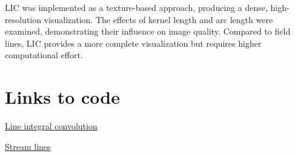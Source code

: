 \documentclass{article}
\begin{document}
LIC was implemented as a texture-based approach, producing a dense, high-resolution visualization. The effects of kernel length and arc length were examined, demonstrating their influence on image quality. Compared to field lines, LIC provides a more complete visualization but requires higher computational effort.


\section*{Links to code}
\href{https://github.com/edvartGB/visualization/blob/main/oblig/lic_vectorized.ipynb}{Line integral convolution}

\noindent \href{https://github.com/edvartGB/visualization/blob/main/oblig/oblig.ipynb}{Stream lines}
\end{document}
